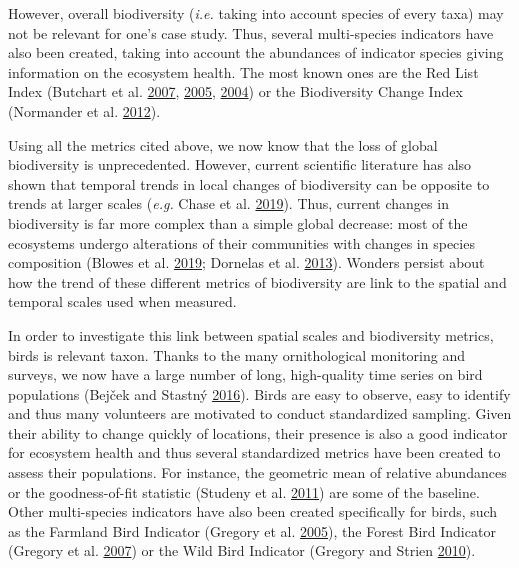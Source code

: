 \documentclass[
  12pt,
  oneside]{report}
\begin{document}
However, overall biodiversity (\emph{i.e.} taking into account species of every taxa) may not be relevant for one's case study. Thus, several multi-species indicators have also been created, taking into account the abundances of indicator species giving information on the ecosystem health. The most known ones are the Red List Index (Butchart et al. \protect\hyperlink{ref-butchart_improvements_2007}{2007}, \protect\hyperlink{ref-butchart_using_2005}{2005}, \protect\hyperlink{ref-butchart_measuring_2004}{2004}) or the Biodiversity Change Index (Normander et al. \protect\hyperlink{ref-normander_indicator_2012}{2012}).

Using all the metrics cited above, we now know that the loss of global biodiversity is unprecedented. However, current scientific literature has also shown that temporal trends in local changes of biodiversity can be opposite to trends at larger scales (\emph{e.g.} Chase et al. \protect\hyperlink{ref-chase_species_2019}{2019}). Thus, current changes in biodiversity is far more complex than a simple global decrease: most of the ecosystems undergo alterations of their communities with changes in species composition (Blowes et al. \protect\hyperlink{ref-blowes_geography_2019}{2019}; Dornelas et al. \protect\hyperlink{ref-dornelas_quantifying_2013}{2013}). Wonders persist about how the trend of these different metrics of biodiversity are link to the spatial and temporal scales used when measured.

In order to investigate this link between spatial scales and biodiversity metrics, birds is relevant taxon. Thanks to the many ornithological monitoring and surveys, we now have a large number of long, high-quality time series on bird populations (Bejček and Stastný \protect\hyperlink{ref-bejcek_velke_2016}{2016}). Birds are easy to observe, easy to identify and thus many volunteers are motivated to conduct standardized sampling. Given their ability to change quickly of locations, their presence is also a good indicator for ecosystem health and thus several standardized metrics have been created to assess their populations. For instance, the geometric mean of relative abundances or the goodness-of-fit statistic (Studeny et al. \protect\hyperlink{ref-studeny_goodness_2011}{2011}) are some of the baseline. Other multi-species indicators have also been created specifically for birds, such as the Farmland Bird Indicator (Gregory et al. \protect\hyperlink{ref-gregory_developing_2005}{2005}), the Forest Bird Indicator (Gregory et al. \protect\hyperlink{ref-gregory_population_2007}{2007}) or the Wild Bird Indicator (Gregory and Strien \protect\hyperlink{ref-gregory_wild_2010}{2010}).
\end{document}
